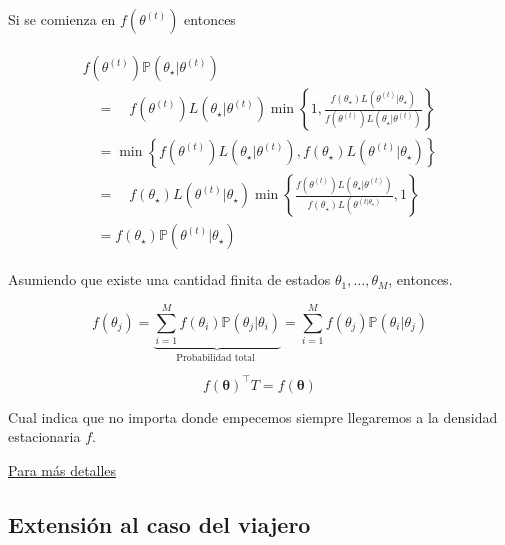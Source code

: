 \documentclass[
  12pt,
]{book}
\theoremstyle{definition}
\theoremstyle{definition}
\theoremstyle{definition}
\theoremstyle{remark}
\begin{document}
Si se comienza en \(f\left(\theta^{(t)}\right)\) entonces

\begin{align}
\begin{array}{l}
f\left(\theta^{(t)}\right) \mathbb{P}\left(\theta_{\star} | \theta^{(t)}\right) \\
\quad=\quad f\left(\theta^{(t)}\right) L\left(\theta_{\star} | \theta^{(t)}\right) \min \left\{1, \frac{f\left(\theta_{\star}\right) L\left(\theta^{(t)} | \theta_{\star}\right)}{f\left(\theta^{(t)}\right) L\left(\theta_{\star} | \theta^{(t)}\right)}\right\} \\
\quad=\min \left\{f\left(\theta^{(t)}\right) L\left(\theta_{\star} | \theta^{(t)}\right), f\left(\theta_{\star}\right) L\left(\theta^{(t)} | \theta_{\star}\right)\right\} \\
\quad=\quad f\left(\theta_{\star}\right) L\left(\theta^{(t)} | \theta_{\star}\right) \min \left\{\frac{f\left(\theta^{(t)}\right) L\left(\theta_{\star} | \theta^{(t)}\right)}{f\left(\theta_{\star}\right) L\left(\theta^{\left(t | \theta_{\star}\right)}\right.}, 1\right\} \\
\quad=f\left(\theta_{\star}\right) \mathbb{P}\left(\theta^{(t)} | \theta_{\star}\right)
\end{array}
\end{align}

Asumiendo que existe una cantidad finita de estados \(\theta_{1}, \ldots, \theta_{M}\), entonces.

\begin{equation*}
f\left(\theta_{j}\right) = \underbrace{\sum_{i=1}^{M} f\left(\theta_{i}\right) \mathbb{P} \left(\theta_{j} | \theta_{i}\right)}_{\text {Probabilidad total  }}=\sum_{i=1}^{M} f\left(\theta_{j}\right) \mathbb{P} \left(\theta_{i} | \theta_{j}\right)
\end{equation*}

\begin{equation}
f(\boldsymbol{\theta})^\top T =   f(\boldsymbol{\theta})
\end{equation}

Cual indica que no importa donde empecemos siempre llegaremos a la densidad estacionaria \(f\).

\href{https://www.ece.iastate.edu/~namrata/EE527_Spring08/l4c.pdf\#page=32}{Para más detalles}

\hypertarget{extensiuxf3n-al-caso-del-viajero}{%
\subsection{Extensión al caso del viajero}\label{extensiuxf3n-al-caso-del-viajero}}
\end{document}
